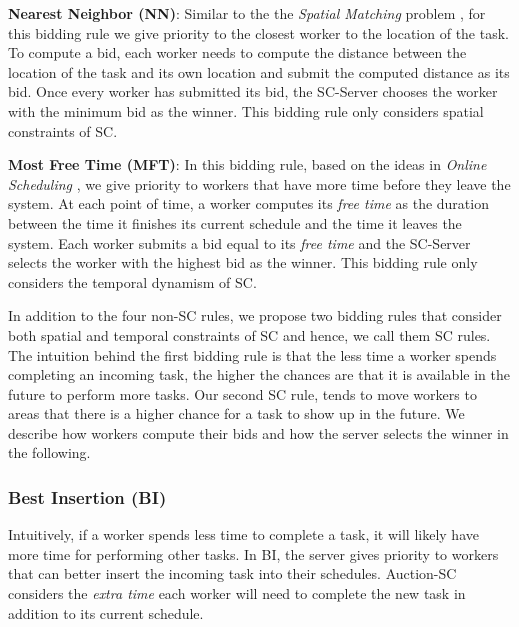 \noindent\textbf{Nearest Neighbor (NN)}:
Similar to the the \emph{Spatial Matching} problem \cite{Wong07}, for this bidding rule we give priority to the closest worker to the location of the task. To compute a bid, each worker needs to compute the distance between the location of the task and its own location and submit the computed distance as its bid. Once every worker has submitted its bid, the SC-Server chooses the worker with the minimum bid as the winner. This bidding rule only considers spatial constraints of SC.

\noindent\textbf{Most Free Time (MFT)}:
In this bidding rule, based on the ideas in \emph{Online Scheduling} \cite{Lee13}, we give priority to workers that have more time before they leave the system. At each point of time, a worker computes its \emph{free time} as the duration between the time it finishes its current schedule and the time it leaves the system. Each worker submits a bid equal to its \emph{free time} and the SC-Server selects the worker with the highest bid as the winner. This bidding rule only considers the temporal dynamism of SC.
 
In addition to the four non-SC rules, we propose two bidding rules that consider both spatial and temporal constraints of SC and hence, we call them SC rules. The intuition behind the first bidding rule is that the less time a worker spends completing an incoming task, the higher the chances are that it is available in the future to perform more tasks. Our second SC rule, tends to move workers to areas that there is a higher chance for a task to show up in the future. We describe how workers compute their bids and how the server selects the winner in the following.\\

\subsubsection{Best Insertion (BI)}

Intuitively, if a worker spends less time to complete a task, it will likely have more time for performing other tasks. In BI, the server gives priority to workers that can better insert the incoming task into their schedules. Auction-SC considers the \textit{extra time} each worker will need to complete the new task in addition to its current schedule.\\

